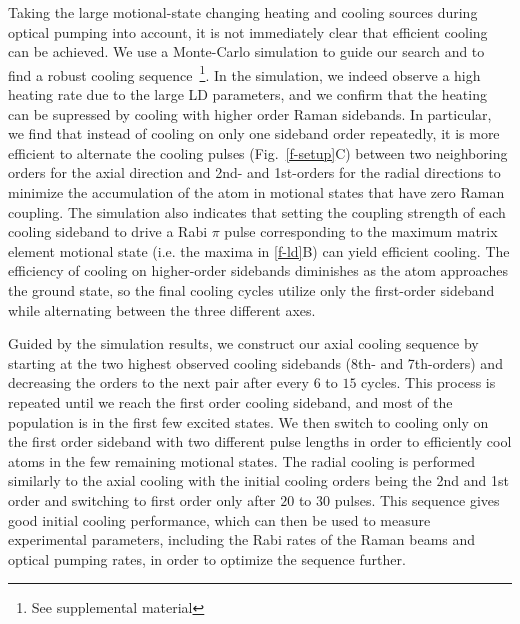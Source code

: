 \documentclass[aps,prl,twocolumn,groupedaddress]{revtex4-1}
\begin{document}
Taking the large motional-state changing heating and cooling sources
during optical pumping into account,
it is not immediately clear that efficient cooling can be achieved.
We use a Monte-Carlo simulation to guide our search and
to find a robust cooling sequence~\footnote{See supplemental material}.
In the simulation, we indeed observe a high heating rate due to the large LD parameters,
and we confirm that the heating can be supressed by cooling with higher order Raman sidebands.
In particular, we find that instead of cooling on only one sideband order repeatedly,
it is more efficient to alternate the cooling pulses (Fig.~\ref{f-setup}C) between two
neighboring orders for the axial direction and 2nd- and 1st-orders for the radial directions
to minimize the accumulation of the atom in motional states that have zero Raman coupling.
The simulation also indicates that setting the coupling strength of each cooling sideband
to drive a Rabi $\pi$ pulse corresponding to the maximum matrix element motional state
(i.e. the maxima in \ref{f-ld}B) can yield efficient cooling.
The efficiency of cooling on higher-order sidebands diminishes
as the atom approaches the ground state, so the final cooling cycles utilize only the first-order sideband while alternating between the three different axes.

Guided by the simulation results,
we construct our axial cooling sequence by starting at the two highest
observed cooling sidebands (8th- and 7th-orders)
and decreasing the orders to the next pair after every $6$ to $15$ cycles.
This process is repeated until we reach the first order cooling sideband, and most of the
population is in the first few excited states. We then switch to cooling only on the
first order sideband with two different pulse lengths in order to efficiently cool atoms in the
few remaining motional states.
The radial cooling is performed similarly to the axial cooling with the initial cooling orders being
the 2nd and 1st order and switching to first order only after $20$ to $30$ pulses.
This sequence gives good initial cooling performance, which can then be used to measure experimental
parameters, including the Rabi rates of the Raman beams and optical pumping rates,
in order to optimize the sequence further.
\end{document}
